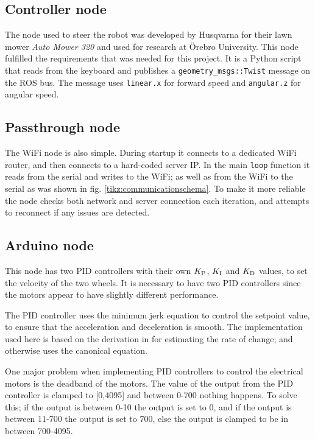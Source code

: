 \documentclass[11pt]{article}
\begin{document}
\newpage


\subsection{Controller node}
The node used to steer the robot was developed by Husqvarna for their lawn mower
\emph{Auto Mower 320} and used for research at Örebro University. This node
fulfilled the requirements that was needed for this project. It is a Python
script that reads from the keyboard and publishes a
\texttt{geometry\_msgs::Twist} message on the ROS bus. The message uses
\texttt{linear.x} for forward speed and \texttt{angular.z} for angular speed.
\label{subsec:cn}


\subsection{Passthrough node}
\label{subsec:ptn}
The WiFi node is also simple. During startup it connects to a dedicated
WiFi router, and then connects to a hard-coded server IP. In the main
\texttt{loop} function it reads from the serial and writes to the WiFi; as well
as from the WiFi to the serial as was shown in
fig. \vref{tikz:communicationschema}. To make it more reliable the node checks
both network and server connection each iteration, and attempts to reconnect if
any issues are detected. \par

\subsection{Arduino node}
\label{subsec:dd}
This node has two PID controllers with their own ${K_{\textup{P}}}$, ${K_{\textup{I}}}$ and
${K_{\textup{D}}}$ values, to set the velocity of the two wheels. It is necessary to
have two PID controllers since the motors appear to have slightly different
performance. \par

The PID controller uses the minimum jerk equation to control the setpoint value,
to ensure that the acceleration and deceleration is smooth. The implementation
used here is based on the derivation in \cite{mje} for estimating the rate of
change; and otherwise uses the canonical equation. \par

One major problem when implementing PID controllers to control the electrical
motors is the deadband of the motors. The value of the output from the PID
controller is clamped to [0,4095] and between 0-700 nothing happens. To solve
this; if the output is between 0-10 the output is set to 0, and if the output is
between 11-700 the output is set to 700, else the output is clamped to be in
between 700-4095.\par
\end{document}
